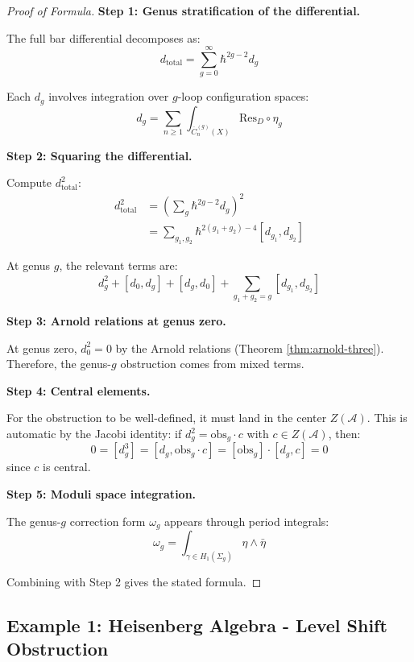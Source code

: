 \begin{proof}[Proof of Formula]

\textbf{Step 1: Genus stratification of the differential.}

The full bar differential decomposes as:
$$d_{\text{total}} = \sum_{g=0}^{\infty} \hbar^{2g-2} d_g$$

Each $d_g$ involves integration over $g$-loop configuration spaces:
$$d_g = \sum_{n \geq 1} \int_{\overline{C}_n^{(g)}(X)} \text{Res}_{D} \circ \eta_g$$

\textbf{Step 2: Squaring the differential.}

Compute $d_{\text{total}}^2$:
\begin{align*}
d_{\text{total}}^2 &= \left(\sum_{g} \hbar^{2g-2} d_g\right)^2 \\
&= \sum_{g_1, g_2} \hbar^{2(g_1+g_2)-4} [d_{g_1}, d_{g_2}]
\end{align*}

At genus $g$, the relevant terms are:
$$d_g^2 + [d_0, d_g] + [d_g, d_0] + \sum_{g_1 + g_2 = g} [d_{g_1}, d_{g_2}]$$

\textbf{Step 3: Arnold relations at genus zero.}

At genus zero, $d_0^2 = 0$ by the Arnold relations (Theorem \ref{thm:arnold-three}). 
Therefore, the genus-$g$ obstruction comes from mixed terms.

\textbf{Step 4: Central elements.}

For the obstruction to be well-defined, it must land in the center $Z(\mathcal{A})$. 
This is automatic by the Jacobi identity: if $d_g^2 = \text{obs}_g \cdot c$ with 
$c \in Z(\mathcal{A})$, then:
$$0 = [d_g^3] = [d_g, \text{obs}_g \cdot c] = [\text{obs}_g] \cdot [d_g, c] = 0$$
since $c$ is central.

\textbf{Step 5: Moduli space integration.}

The genus-$g$ correction form $\omega_g$ appears through period integrals:
$$\omega_g = \int_{\gamma \in H_1(\Sigma_g)} \eta \wedge \bar{\eta}$$

Combining with Step 2 gives the stated formula.
\end{proof}

\subsection{Example 1: Heisenberg Algebra - Level Shift Obstruction}
\label{subsec:heisenberg-obstruction}

